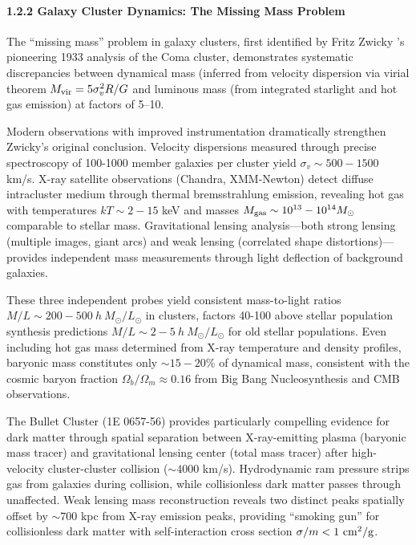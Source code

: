 \documentclass[11pt,a4paper]{article}
\begin{document}
\hypertarget{galaxy-cluster-dynamics-the-missing-mass-problem}{%
\paragraph{1.2.2 Galaxy Cluster Dynamics: The Missing Mass
Problem}\label{galaxy-cluster-dynamics-the-missing-mass-problem}}

The ``missing mass'' problem in galaxy clusters, first identified by
Fritz Zwicky \cite{Zwicky1933}'s pioneering 1933 analysis of the Coma cluster,
demonstrates systematic discrepancies between dynamical mass (inferred
from velocity dispersion via virial theorem
\(M_{\rm vir} = 5\sigma_v^2 R/G\) and luminous mass (from integrated
starlight and hot gas emission) at factors of 5--10.

Modern observations with improved instrumentation dramatically
strengthen Zwicky's original conclusion. Velocity dispersions measured
through precise spectroscopy of 100-1000 member galaxies per cluster
yield \(\sigma_v \sim 500-1500\) km/s. X-ray satellite observations
(Chandra, XMM-Newton) detect diffuse intracluster medium through thermal
bremsstrahlung emission, revealing hot gas with temperatures
\(kT \sim 2-15\) keV and masses
\(M_{\rm gas} \sim 10^{13}-10^{14} M_\odot\) comparable to stellar mass.
Gravitational lensing analysis---both strong lensing (multiple images,
giant arcs) and weak lensing (correlated shape distortions)---provides
independent mass measurements through light deflection of background
galaxies.

These three independent probes yield consistent mass-to-light ratios
\(M/L \sim 200-500~h~M_\odot/L_\odot\) in clusters, factors 40-100 above
stellar population synthesis predictions
\(M/L \sim 2-5~h~M_\odot/L_\odot\) for old stellar populations. Even
including hot gas mass determined from X-ray temperature and density
profiles, baryonic mass constitutes only \(\sim 15-20\%\) of dynamical
mass, consistent with the cosmic baryon fraction
\(\Omega_b/\Omega_m \approx 0.16\) from Big Bang Nucleosynthesis and CMB
observations.

The Bullet Cluster (1E 0657-56) provides particularly compelling
evidence for dark matter through spatial separation between
X-ray-emitting plasma (baryonic mass tracer) and gravitational lensing
center (total mass tracer) after high-velocity cluster-cluster collision
(\(\sim 4000\) km/s). Hydrodynamic ram pressure strips gas from galaxies
during collision, while collisionless dark matter passes through
unaffected. Weak lensing mass reconstruction reveals two distinct peaks
spatially offset by \(\sim 700\) kpc from X-ray emission peaks,
providing ``smoking gun'' for collisionless dark matter with
self-interaction cross section \(\sigma/m < 1~{\rm cm^2/g}\).
\end{document}
